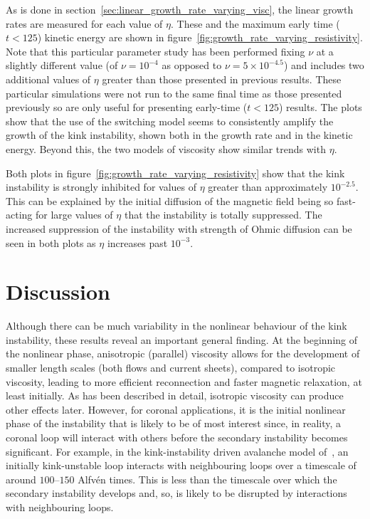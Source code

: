 As is done in section~\ref{sec:linear_growth_rate_varying_visc}, the linear growth rates are measured for each value of $\eta$. These and the maximum early time ($t<125$) kinetic energy are shown in figure~\ref{fig:growth_rate_varying_resistivity}. Note that this particular parameter study has been performed fixing $\nu$ at a slightly different value (of $\nu=10^{-4}$ as opposed to $\nu = 5 \times 10^{-4.5}$) and includes two additional values of $\eta$ greater than those presented in previous results. These particular simulations were not run to the same final time as those presented previously so are only useful for presenting early-time ($t<125$) results. The plots show that the use of the switching model seems to consistently amplify the growth of the kink instability, shown both in the growth rate and in the kinetic energy. Beyond this, the two models of viscosity show similar trends with $\eta$.

Both plots in figure~\ref{fig:growth_rate_varying_resistivity} show that the kink instability is strongly inhibited for values of $\eta$ greater than approximately $10^{-2.5}$. This can be explained by the initial diffusion of the magnetic field being so fast-acting for large values of $\eta$ that the instability is totally suppressed. The increased suppression of the instability with strength of Ohmic diffusion can be seen in both plots as $\eta$ increases past $10^{-3}$.

\section{Discussion}

\label{sec:discussion}

Although there can be much variability in the nonlinear behaviour of the kink instability, these results reveal an important general finding. At the beginning of the nonlinear phase, anisotropic (parallel) viscosity allows for the development of smaller length scales (both flows and current sheets), compared to isotropic viscosity, leading to more efficient reconnection and faster magnetic relaxation, at least initially. As has been described in detail, isotropic viscosity can produce other effects later. However, for coronal applications, it is the initial nonlinear phase of the instability that is likely to be of most interest since, in reality, a coronal loop will interact with others before the secondary instability becomes significant. For example, in the kink-instability driven avalanche model of~\cite{hoodMHDAvalancheModel2015}, an initially kink-unstable loop interacts with neighbouring loops over a timescale of around $100$--$150$ Alfv\'en times. This is less than the timescale over which the secondary instability develops and, so, is likely to be disrupted by interactions with neighbouring loops.

